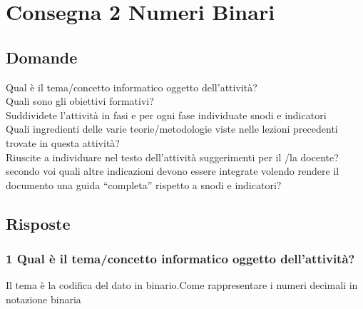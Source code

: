 \documentclass[a4paper]{article}
\begin{document}
\section{Consegna 2 \large Numeri Binari}
\subsection{Domande}
Qual è il tema/concetto informatico oggetto dell’attività?\\

Quali sono gli obiettivi formativi?\\

Suddividete l’attività in fasi e per ogni fase individuate snodi  e indicatori\\

Quali ingredienti delle varie teorie/metodologie viste nelle lezioni precedenti trovate in questa attività?\\

Riuscite a individuare nel testo dell’attività suggerimenti per il /la docente? secondo voi quali altre indicazioni devono essere integrate volendo rendere il documento una guida “completa” rispetto a snodi e indicatori?\\

\newpage
\subsection{Risposte}
\subsubsection{1 Qual è il tema/concetto informatico oggetto dell’attività?} 
Il tema è la codifica del dato in binario.Come rappresentare i numeri decimali in notazione binaria
\end{document}
